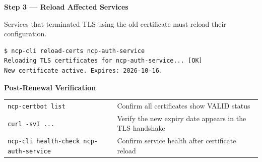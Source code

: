 \begin{stepbox}
\textbf{Step 3 --- Reload Affected Services}\smallskip

Services that terminated TLS using the old certificate must reload their configuration.
\end{stepbox}

\begin{cmdbox}
\begin{Verbatim}[fontsize=\footnotesize]
$ ncp-cli reload-certs ncp-auth-service
Reloading TLS certificates for ncp-auth-service... [OK]
New certificate active. Expires: 2026-10-16.
\end{Verbatim}
\end{cmdbox}

\begin{successbox}
\textbf{Post-Renewal Verification}\\[2pt]
\begin{tabularx}{\linewidth}{@{}l>{\raggedright\arraybackslash}X@{}}
\texttt{ncp-certbot list} & Confirm all certificates show VALID status \\
\texttt{curl -svI ...} & Verify the new expiry date appears in the TLS handshake \\
\texttt{ncp-cli health-check ncp-auth-service} & Confirm service health after certificate reload \\
\end{tabularx}
\end{successbox}
